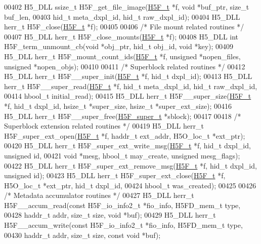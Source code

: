 \begin{DoxyCode}
00402 H5\_DLL ssize\_t H5F\_get\_file\_image(\hyperlink{struct_h5_f__t}{H5F\_t} *f, \textcolor{keywordtype}{void} *buf\_ptr, \textcolor{keywordtype}{size\_t} buf\_len,
00403     hid\_t meta\_dxpl\_id, hid\_t raw\_dxpl\_id);
00404 H5\_DLL herr\_t H5F\_close(\hyperlink{struct_h5_f__t}{H5F\_t} *f);
00405 
00406 \textcolor{comment}{/* File mount related routines */}
00407 H5\_DLL herr\_t H5F\_close\_mounts(\hyperlink{struct_h5_f__t}{H5F\_t} *f);
00408 H5\_DLL \textcolor{keywordtype}{int} H5F\_term\_unmount\_cb(\textcolor{keywordtype}{void} *obj\_ptr, hid\_t obj\_id, \textcolor{keywordtype}{void} *key);
00409 H5\_DLL herr\_t H5F\_mount\_count\_ids(\hyperlink{struct_h5_f__t}{H5F\_t} *f, \textcolor{keywordtype}{unsigned} *nopen\_files, \textcolor{keywordtype}{unsigned} *nopen\_objs);
00410 
00411 \textcolor{comment}{/* Superblock related routines */}
00412 H5\_DLL herr\_t H5F\_\_super\_init(\hyperlink{struct_h5_f__t}{H5F\_t} *f, hid\_t dxpl\_id);
00413 H5\_DLL herr\_t H5F\_\_super\_read(\hyperlink{struct_h5_f__t}{H5F\_t} *f, hid\_t meta\_dxpl\_id, hid\_t raw\_dxpl\_id,
00414     hbool\_t initial\_read);
00415 H5\_DLL herr\_t H5F\_\_super\_size(\hyperlink{struct_h5_f__t}{H5F\_t} *f, hid\_t dxpl\_id, hsize\_t *super\_size, hsize\_t *super\_ext\_size);
00416 H5\_DLL herr\_t H5F\_\_super\_free(\hyperlink{struct_h5_f__super__t}{H5F\_super\_t} *sblock);
00417 
00418 \textcolor{comment}{/* Superblock extension related routines */}
00419 H5\_DLL herr\_t H5F\_super\_ext\_open(\hyperlink{struct_h5_f__t}{H5F\_t} *f, haddr\_t ext\_addr, H5O\_loc\_t *ext\_ptr);
00420 H5\_DLL herr\_t H5F\_super\_ext\_write\_msg(\hyperlink{struct_h5_f__t}{H5F\_t} *f, hid\_t dxpl\_id, \textcolor{keywordtype}{unsigned} \textcolor{keywordtype}{id},
00421     \textcolor{keywordtype}{void} *mesg, hbool\_t may\_create, \textcolor{keywordtype}{unsigned} mesg\_flags);
00422 H5\_DLL herr\_t H5F\_super\_ext\_remove\_msg(\hyperlink{struct_h5_f__t}{H5F\_t} *f, hid\_t dxpl\_id, \textcolor{keywordtype}{unsigned} \textcolor{keywordtype}{id});
00423 H5\_DLL herr\_t H5F\_super\_ext\_close(\hyperlink{struct_h5_f__t}{H5F\_t} *f, H5O\_loc\_t *ext\_ptr, hid\_t dxpl\_id,
00424     hbool\_t was\_created);
00425 
00426 \textcolor{comment}{/* Metadata accumulator routines */}
00427 H5\_DLL herr\_t H5F\_\_accum\_read(\textcolor{keyword}{const} H5F\_io\_info2\_t *fio\_info, H5FD\_mem\_t type,
00428     haddr\_t addr, \textcolor{keywordtype}{size\_t} size, \textcolor{keywordtype}{void} *buf);
00429 H5\_DLL herr\_t H5F\_\_accum\_write(\textcolor{keyword}{const} H5F\_io\_info2\_t *fio\_info, H5FD\_mem\_t type,
00430     haddr\_t addr, \textcolor{keywordtype}{size\_t} size, \textcolor{keyword}{const} \textcolor{keywordtype}{void} *buf);

\end{DoxyCode}
